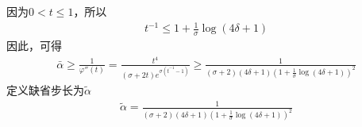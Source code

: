             因为$0<t\leqslant 1$，所以
            \begin{align*}
            t^{-1} \leqslant 1+\frac{1}{\sigma}\log(4\delta +1)
            \end{align*}
            因此，可得
            \begin{align*}
            \bar{\alpha} \geqslant \frac{1}{{\varphi}''(t)}=\frac{t^4}{(\sigma+2t)e^{\sigma(t^{-1}-1)}}\geqslant \frac{1}{(\sigma+2)(4\delta+1)(1+\frac{1}{\sigma}\log(4\delta +1))^2}
            \end{align*}
            定义缺省步长为$\tilde{\alpha}$
            \begin{align*}
            \tilde{\alpha} = \frac{1}{(\sigma+2)(4\delta+1)(1+\frac{1}{\sigma}\log(4\delta +1))^2}
            \end{align*}


% 
